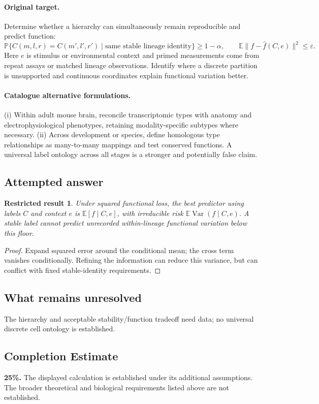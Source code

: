 \documentclass[11pt]{article}
\newcommand{\E}{\mathbb E}
\newcommand{\Prob}{\mathbb P}
\providecommand{\E}{\mathbb E}
\providecommand{\Prob}{\mathbb P}
\newtheorem{attemptresult}{Restricted result}[section]
\begin{document}
\paragraph{Original target.}
Determine whether a hierarchy can simultaneously remain reproducible and predict function:
\[\Prob\{C(m,l,r)=C(m',l',r')\mid\text{same stable lineage identity}\}\ge1-\alpha,\qquad \E\|f-\widehat f(C,e)\|^2\le\varepsilon.\]
Here $e$ is stimulus or environmental context and primed measurements come from repeat assays or matched lineage observations. Identify where a discrete partition is unsupported and continuous coordinates explain functional variation better.
\paragraph{Catalogue alternative formulations.}
(i) Within adult mouse brain, reconcile transcriptomic types with anatomy and electrophysiological phenotypes, retaining modality-specific subtypes where necessary. (ii) Across development or species, define homologous type relationships as many-to-many mappings and test conserved functions. A universal label ontology across all stages is a stronger and potentially false claim.
\subsection{Attempted answer}
\begin{attemptresult}
Under squared functional loss, the best predictor using labels $C$ and context $e$ is $\E[f\mid C,e]$, with irreducible risk $\E\operatorname{Var}(f\mid C,e)$. A stable label cannot predict unrecorded within-lineage functional variation below this floor.
\end{attemptresult}
\begin{proof}
Expand squared error around the conditional mean; the cross term vanishes conditionally. Refining the information can reduce this variance, but can conflict with fixed stable-identity requirements.
\end{proof}
\subsection{What remains unresolved}
The hierarchy and acceptable stability/function tradeoff need data; no universal discrete cell ontology is established.
\subsection{Completion Estimate}
\textbf{25\%.} The displayed calculation is established under its additional assumptions. The broader theoretical and biological requirements listed above are not established.
\end{document}
